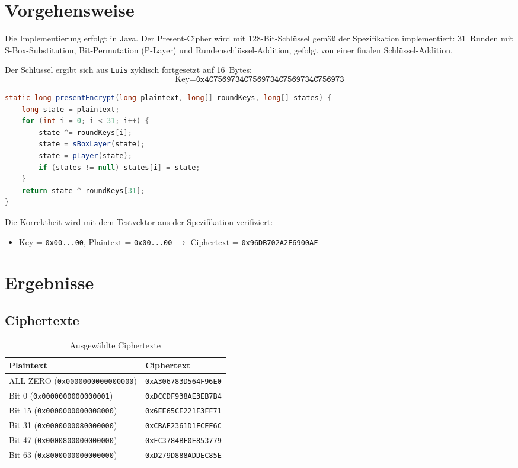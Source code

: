 \documentclass[
    fontsize=12pt,          %
    paper=a4,               %
    numbers=noenddot,       %
    listof=totoc,           %
    listof=entryprefix,     %
    listof=nochaptergap,    %
    bibliography=totoc,     %
    parskip=half,           %
    openany                 %
]{scrbook}
\begin{document}
\section*{Vorgehensweise}

Die Implementierung erfolgt in Java.
Der Present-Cipher wird mit 128-Bit-Schlüssel gemäß der Spezifikation implementiert: 31~Runden mit S-Box-Substitution, Bit-Permutation (P-Layer) und Rundenschlüssel-Addition, gefolgt von einer finalen Schlüssel-Addition.

Der Schlüssel ergibt sich aus \texttt{Luis} zyklisch fortgesetzt auf 16~Bytes:
\[
    \text{Key} = \texttt{0x4C7569734C7569734C7569734C756973}
\]

\begin{lstlisting}[language=Java, caption={Present-Rundenfunktion}]
static long presentEncrypt(long plaintext, long[] roundKeys, long[] states) {
    long state = plaintext;
    for (int i = 0; i < 31; i++) {
        state ^= roundKeys[i];
        state = sBoxLayer(state);
        state = pLayer(state);
        if (states != null) states[i] = state;
    }
    return state ^ roundKeys[31];
}
\end{lstlisting}

Die Korrektheit wird mit dem Testvektor aus der Spezifikation verifiziert:
\begin{itemize}
    \item Key = \texttt{0x00...00}, Plaintext = \texttt{0x00...00} $\rightarrow$ Ciphertext = \texttt{0x96DB702A2E6900AF} \checkmark
\end{itemize}


\section*{Ergebnisse}


\subsection*{Ciphertexte}

\begin{table}[H]
    \centering
    \begin{tabular}{l l}
        \toprule
        \textbf{Plaintext} & \textbf{Ciphertext} \\
        \midrule
        ALL-ZERO (\texttt{0x0000000000000000}) & \texttt{0xA306783D564F96E0} \\
        Bit 0 (\texttt{0x0000000000000001})    & \texttt{0xDCCDF938AE3EB7B4} \\
        Bit 15 (\texttt{0x0000000000008000})   & \texttt{0x6EE65CE221F3FF71} \\
        Bit 31 (\texttt{0x0000000080000000})   & \texttt{0xCBAE2361D1FCEF6C} \\
        Bit 47 (\texttt{0x0000800000000000})   & \texttt{0xFC3784BF0E853779} \\
        Bit 63 (\texttt{0x8000000000000000})   & \texttt{0xD279D888ADDEC85E} \\
        \bottomrule
    \end{tabular}
    \caption{Ausgewählte Ciphertexte}
\end{table}
\end{document}
